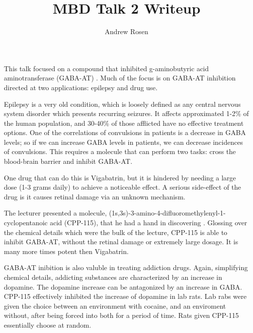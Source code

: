 \documentclass[10pt,letterpaper]{article}
\author{Andrew Rosen}
\title{MBD Talk 2 Writeup}
\begin{document}
	\maketitle
	
	
	This talk focused on a compound that inhibited g-aminobutyric acid aminotransferase (GABA-AT) \cite{gata}.
	Much of the focus is on GABA-AT inhibition directed at two applications:  epilepsy and drug use.
	
	Epilepsy is a very old condition, which is loosely defined as  any central nervous system disorder which presents recurring seizures.
	It affects approximated 1-2\% of the human population, and 30-40\% of those afflicted have no effective treatment options.
	One of the correlations of convulsions in patients is a decrease in GABA levels; so if we can increase GABA levels in patients, we can decrease incidences of convulsions.
	This requires a molecule that can perform two tasks: cross the blood-brain barrier and inhibit GABA-AT.
	
	One drug that can do this is Vigabatrin, but it is hindered by needing a large dose (1-3 grams daily) to achieve a noticeable effect.
	A serious side-effect of the drug is it causes retinal damage via an unknown mechanism.
	
	The lecturer presented a molecule, (1s,3s)-3-amino-4-difluoromethylenyl-1-cyclopentanoic acid (CPP-115), that he had a hand in discovering \cite{silverman2011methods}.  
	Glossing over the chemical details which were the bulk of the lecture, CPP-115 is able to inhibit GABA-AT, without the retinal damage or extremely large dosage.
	It is many more times potent then Vigabatrin.
	
	
	GABA-AT inibition is also valuble in treating addiction drugs.
	Again, simplifying chemical details, addicting substances are characterized by an increase in dopamine.
	The dopamine increase can be antagonized by an increase in GABA.
	CPP-115 effectively inhibited the increase of dopamine  in lab rats\cite{pan20111}.
	Lab rabs were given the choice between an environment with cocaine, and an enviroment without, after being forced into both for a period of time.
	Rats given CPP-115 essentially choose at random.
	
	
	
	
\end{document}
